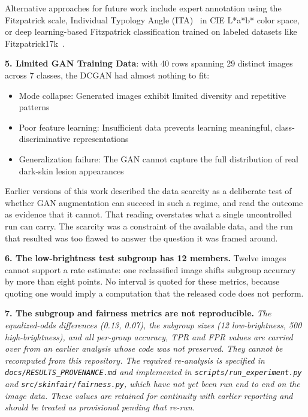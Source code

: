 \documentclass[ai,article,submit,pdftex,moreauthors]{Definitions/mdpi}
\begin{document}
Alternative approaches for future work include expert annotation using the Fitzpatrick scale, Individual Typology Angle (ITA)~\cite{chardon1991} in CIE L*a*b* color space, or deep learning-based Fitzpatrick classification trained on labeled datasets like Fitzpatrick17k~\cite{groh2021}.

\textbf{5. Limited GAN Training Data}: with 40 rows spanning 29 distinct images across 7 classes, the DCGAN had almost nothing to fit:
\begin{itemize}[leftmargin=*, itemsep=2pt]
    \item Mode collapse: Generated images exhibit limited diversity and repetitive patterns
    \item Poor feature learning: Insufficient data prevents learning meaningful, class-discriminative representations
    \item Generalization failure: The GAN cannot capture the full distribution of real dark-skin lesion appearances
\end{itemize}

Earlier versions of this work described the data scarcity as a deliberate test of whether GAN augmentation can succeed in such a regime, and read the outcome as evidence that it cannot. That reading overstates what a single uncontrolled run can carry. The scarcity was a constraint of the available data, and the run that resulted was too flawed to answer the question it was framed around.

\textbf{6. The low-brightness test subgroup has 12 members.} Twelve images cannot support a rate estimate: one reclassified image shifts subgroup accuracy by more than eight points. No interval is quoted for these metrics, because quoting one would imply a computation that the released code does not perform.

\textbf{7. The subgroup and fairness metrics are not reproducible.} \textit{The equalized-odds differences (0.13, 0.07), the subgroup sizes (12 low-brightness, 500 high-brightness), and all per-group accuracy, TPR and FPR values are carried over from an earlier analysis whose code was not preserved. They cannot be recomputed from this repository. The required re-analysis is specified in \texttt{docs/RESULTS\_PROVENANCE.md} and implemented in \texttt{scripts/run\_experiment.py} and \texttt{src/skinfair/fairness.py}, which have not yet been run end to end on the image data. These values are retained for continuity with earlier reporting and should be treated as provisional pending that re-run.}
\end{document}

